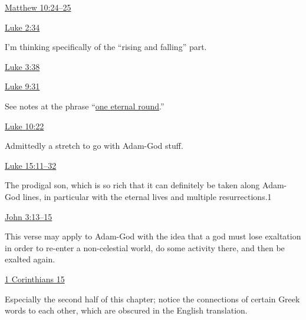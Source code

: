 			\begin{compactdesc}
				\item[{\hyperref[MATTHEW-10-24]{Matthew 10:24--25}}]
				\item[{\hyperref[LUKE-2-34]{Luke 2:34}}] \phantom{.}
					\begin{compactitem}
						\item I'm thinking specifically of the ``rising and falling'' part.
					\end{compactitem}
				\item[{\hyperref[LUKE-3-38]{Luke 3:38}}]
				\item[{\hyperref[LUKE-9-31]{Luke 9:31}}] \phantom{.}
					\begin{compactitem}
						\item See notes at the phrase ``\hyperref[ROUND-PHRASES]{one eternal round}.''
					\end{compactitem}
				\item[{\hyperref[LUKE-10-22]{Luke 10:22}}] \phantom{.}
					\begin{compactitem}
						\item Admittedly a stretch to go with Adam-God stuff.
					\end{compactitem}
				\item[{\hyperref[LUKE-15-11]{Luke 15:11--32}}] \phantom{.}
					\begin{compactitem}
						\item The prodigal son, which is so rich that it can definitely be taken along Adam-God lines, in particular with the eternal lives and multiple resurrections.1
					\end{compactitem}
				\item[{\hyperref[JOHN-3-13]{John 3:13--15}}] 
					\begin{compactitem}
						\item This verse may apply to Adam-God with the idea that a god must lose exaltation in order to re-enter a non-celestial world, do some activity there, and then be exalted again.
					\end{compactitem}
				\item[{\hyperref[1CORINTHIANS-15]{1 Corinthians 15}}] \phantom{.}
					\begin{compactitem}
						\item Especially the second half of this chapter; notice the connections of certain Greek words to each other, which are obscured in the English translation.

\end{compactitem}
\end{compactdesc}
